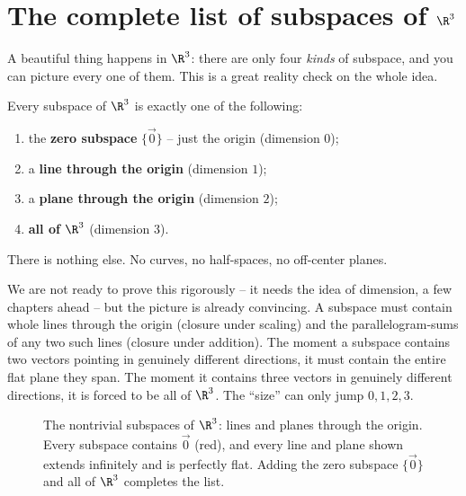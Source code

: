 \section{The complete list of subspaces of $\R^3$}

A beautiful thing happens in $\R^3$: there are only four \emph{kinds} of subspace, and you
can picture every one of them. This is a great reality check on the whole idea.

\begin{theorem}\label{ch11:r3-subspaces}
Every subspace of $\R^3$ is exactly one of the following:
\begin{enumerate}[label=(\roman*)]
  \item the \textbf{zero subspace} $\{\vec{0}\}$ -- just the origin (dimension $0$);
  \item a \textbf{line through the origin} (dimension $1$);
  \item a \textbf{plane through the origin} (dimension $2$);
  \item \textbf{all of $\R^3$} (dimension $3$).
\end{enumerate}
There is nothing else. No curves, no half-spaces, no off-center planes.
\end{theorem}

We are not ready to prove this rigorously -- it needs the idea of dimension, a few chapters
ahead -- but the picture is already convincing. A subspace must contain whole lines
through the origin (closure under scaling) and the parallelogram-sums of any two such lines
(closure under addition). The moment a subspace contains two vectors pointing in genuinely
different directions, it must contain the entire flat plane they span. The moment it
contains three vectors in genuinely different directions, it is forced to be all of $\R^3$.
The ``size'' can only jump $0,1,2,3$.

\begin{figure}[H]
\centering
{}
\caption{The nontrivial subspaces of $\R^3$: lines and planes through the origin. Every
subspace contains $\vec{0}$ (red), and every line and plane shown extends infinitely and
is perfectly flat. Adding the zero subspace $\{\vec{0}\}$ and all of $\R^3$ completes the
list.}
\label{ch11:fig-r3subs}
\end{figure}

